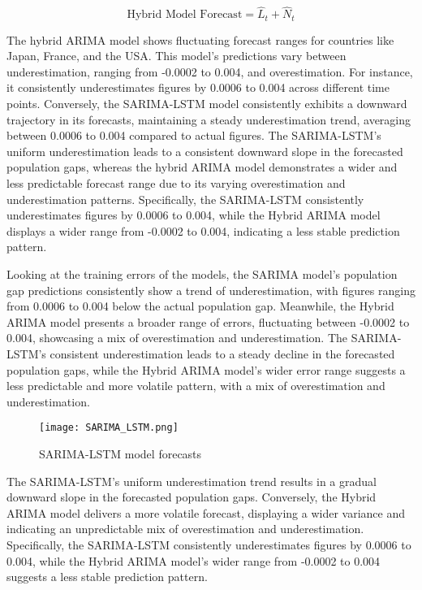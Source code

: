 \documentclass[hidelinks,11pts]{article}
\DeclareMathOperator{\1}{\mathbbm{1}}
\begin{document}
 \begin{equation*}
\text{Hybrid Model Forecast} = \hat{L}_t + \hat{N}_t
 \end{equation*}
 

The hybrid ARIMA model shows fluctuating forecast ranges for countries like Japan, France, and the USA. This model's predictions vary between underestimation, ranging from -0.0002 to 0.004, and overestimation. For instance, it consistently underestimates figures by 0.0006 to 0.004 across different time points. Conversely, the SARIMA-LSTM model consistently exhibits a downward trajectory in its forecasts, maintaining a steady underestimation trend, averaging between 0.0006 to 0.004 compared to actual figures. The SARIMA-LSTM's uniform underestimation leads to a consistent downward slope in the forecasted population gaps, whereas the hybrid ARIMA model demonstrates a wider and less predictable forecast range due to its varying overestimation and underestimation patterns. Specifically, the SARIMA-LSTM consistently underestimates figures by 0.0006 to 0.004, while the Hybrid ARIMA model displays a wider range from -0.0002 to 0.004, indicating a less stable prediction pattern.

Looking at the training errors of the models, the SARIMA model's population gap predictions consistently show a trend of underestimation, with figures ranging from 0.0006 to 0.004 below the actual population gap. Meanwhile, the Hybrid ARIMA model presents a broader range of errors, fluctuating between -0.0002 to 0.004, showcasing a mix of overestimation and underestimation. The SARIMA-LSTM's consistent underestimation leads to a steady decline in the forecasted population gaps, while the Hybrid ARIMA model's wider error range suggests a less predictable and more volatile pattern, with a mix of overestimation and underestimation.

\begin{figure}
    \centering
    \texttt{[image: SARIMA\_LSTM.png]}
    \caption{SARIMA-LSTM model forecasts}
    \label{fig:hybSARIMA}
\end{figure}

The SARIMA-LSTM's uniform underestimation trend results in a gradual downward slope in the forecasted population gaps. Conversely, the Hybrid ARIMA model delivers a more volatile forecast, displaying a wider variance and indicating an unpredictable mix of overestimation and underestimation. Specifically, the SARIMA-LSTM consistently underestimates figures by 0.0006 to 0.004, while the Hybrid ARIMA model's wider range from -0.0002 to 0.004 suggests a less stable prediction pattern.
\end{document}
